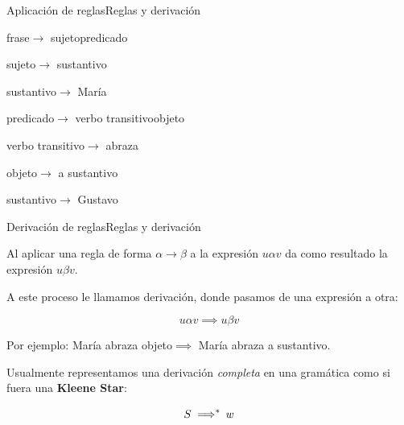 \documentclass[spanish, handout]{beamer}
\begin{document}
\begin{frame}{Aplicación de reglas}{Reglas y derivación}
     \pause
    
    \textlangle frase\textrangle $\to$ \textlangle \alert<3>{sujeto}\textrangle \textlangle \alert<5>{predicado}\textrangle \pause

    \bigskip

    \textlangle \alert<3>{sujeto}\textrangle $\to$ \textlangle \alert<4>{sustantivo}\textrangle \pause

    \bigskip
            
    \textlangle \alert<4>{sustantivo}\textrangle $\to$ \alert<9>{María} \pause

    \bigskip

    \textlangle \alert<5>{predicado}\textrangle $\to$ \textlangle \alert<6>{verbo transitivo}\textrangle \textlangle \alert<7>{objeto}\textrangle \pause

    \bigskip

    \textlangle \alert<6>{verbo transitivo}\textrangle $\to$ \alert<9>{abraza} \pause

    \bigskip

    \textlangle \alert<7>{objeto}\textrangle $\to$ \alert<9>{a} \textlangle \alert<8>{sustantivo}\textrangle \pause

    \bigskip

    \textlangle \alert<8>{sustantivo}\textrangle $\to$ \alert<9>{Gustavo} \pause

    \bigskip

    \begin{center}
    \end{center}

\end{frame}

\begin{frame}{Derivación de reglas}{Reglas y derivación}
    
    Al aplicar una regla de forma $\alpha \to \beta$ a la expresión $u \alpha v$ da como resultado la expresión $u \beta v$. \pause

    \bigskip

    A este proceso le llamamos \alert{derivación}, donde pasamos de una expresión a otra:
    
    \[u \alpha v \implies u \beta v\] \pause

    Por ejemplo: María abraza \textlangle objeto\textrangle $\implies$ María abraza a \textlangle sustantivo\textrangle. \pause

    \bigskip

    Usualmente representamos una derivación \textit{completa} en una gramática como si fuera una \textbf{Kleene Star}:

    \[S \implies\mkern-10mu ^{*} \enspace w\]
    
\end{frame}
\end{document}
